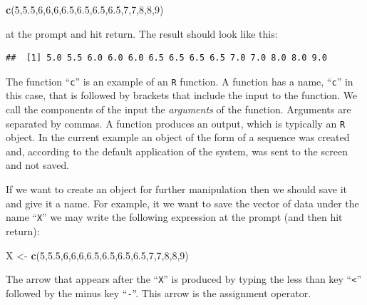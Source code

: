 \documentclass[
]{krantz}
\makeatletter
\newenvironment{Shaded}{\begin{snugshade}}{\end{snugshade}}
\newcommand{\DecValTok}[1]{\textcolor[rgb]{0.00,0.00,0.81}{#1}}
\newcommand{\FloatTok}[1]{\textcolor[rgb]{0.00,0.00,0.81}{#1}}
\newcommand{\KeywordTok}[1]{\textcolor[rgb]{0.13,0.29,0.53}{\textbf{#1}}}
\newcommand{\NormalTok}[1]{#1}
\newcommand{\StringTok}[1]{\textcolor[rgb]{0.31,0.60,0.02}{#1}}
\newenvironment{kframe}{%
\medskip{}
\setlength{\fboxsep}{.8em}
 \def\at@end@of@kframe{}%
 \ifinner\ifhmode%
  \def\at@end@of@kframe{\end{minipage}}%
  \begin{minipage}{\columnwidth}%
 \fi\fi%
 \def\FrameCommand##1{\hskip\@totalleftmargin \hskip-\fboxsep
 \colorbox{shadecolor}{##1}\hskip-\fboxsep
     \hskip-\linewidth \hskip-\@totalleftmargin \hskip\columnwidth}%
 \MakeFramed {\advance\hsize-\width
   \@totalleftmargin\z@ \linewidth\hsize
   \@setminipage}}%
 {\par\unskip\endMakeFramed%
 \at@end@of@kframe}
\renewenvironment{Shaded}{\begin{kframe}}{\end{kframe}}
\theoremstyle{definition}
\theoremstyle{definition}
\theoremstyle{definition}
\theoremstyle{remark}
\makeatother
\begin{document}
\begin{Shaded}
\begin{Highlighting}[]
\KeywordTok{c}\NormalTok{(}\DecValTok{5}\NormalTok{,}\FloatTok{5.5}\NormalTok{,}\DecValTok{6}\NormalTok{,}\DecValTok{6}\NormalTok{,}\DecValTok{6}\NormalTok{,}\FloatTok{6.5}\NormalTok{,}\FloatTok{6.5}\NormalTok{,}\FloatTok{6.5}\NormalTok{,}\FloatTok{6.5}\NormalTok{,}\DecValTok{7}\NormalTok{,}\DecValTok{7}\NormalTok{,}\DecValTok{8}\NormalTok{,}\DecValTok{8}\NormalTok{,}\DecValTok{9}\NormalTok{)}
\end{Highlighting}
\end{Shaded}

at the prompt and hit return. The result should look like this:

\begin{verbatim}
##  [1] 5.0 5.5 6.0 6.0 6.0 6.5 6.5 6.5 6.5 7.0 7.0 8.0 8.0 9.0
\end{verbatim}

The function ``\texttt{c}'' is an example of an \texttt{R} function. A function has a name, ``\texttt{c}'' in this case, that is followed by brackets that include the input to the function. We call the components of the input the \emph{arguments} of the function. Arguments are separated by commas. A function produces an output, which is typically an \texttt{R} object. In the current example an object of the form of a sequence was created and, according to the default application of the system, was sent to the screen and not saved.

If we want to create an object for further manipulation then we should save it and give it a name. For example, it we want to save the vector of data under the name ``\texttt{X}'' we may write the following expression at the prompt (and then hit return):

\begin{Shaded}
\begin{Highlighting}[]
\NormalTok{X <-}\StringTok{ }\KeywordTok{c}\NormalTok{(}\DecValTok{5}\NormalTok{,}\FloatTok{5.5}\NormalTok{,}\DecValTok{6}\NormalTok{,}\DecValTok{6}\NormalTok{,}\DecValTok{6}\NormalTok{,}\FloatTok{6.5}\NormalTok{,}\FloatTok{6.5}\NormalTok{,}\FloatTok{6.5}\NormalTok{,}\FloatTok{6.5}\NormalTok{,}\DecValTok{7}\NormalTok{,}\DecValTok{7}\NormalTok{,}\DecValTok{8}\NormalTok{,}\DecValTok{8}\NormalTok{,}\DecValTok{9}\NormalTok{)}
\end{Highlighting}
\end{Shaded}

The arrow that appears after the ``\texttt{X}'' is produced by typing the less than key ``\texttt{\textless{}}'' followed by the minus key ``\texttt{-}''. This arrow is the assignment operator.
\end{document}
